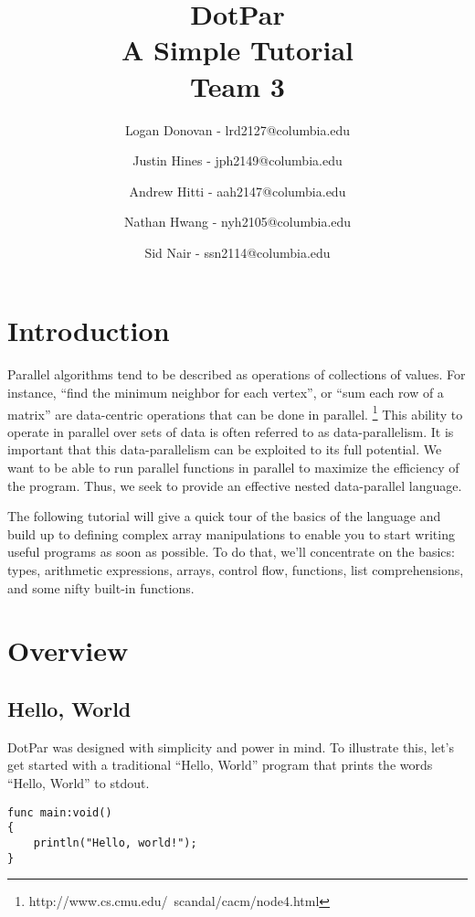 \documentclass{article}
\begin{document}
\title{DotPar \\ A Simple Tutorial \\ Team 3}
\author{
Logan Donovan - lrd2127@columbia.edu \and
Justin Hines - jph2149@columbia.edu \and
Andrew Hitti - aah2147@columbia.edu \and
Nathan Hwang - nyh2105@columbia.edu \and
Sid Nair - ssn2114@columbia.edu}
\maketitle

\section{Introduction}
Parallel algorithms tend to be described as operations of collections of values. For instance, ``find the minimum neighbor for each vertex'', or ``sum each row of a matrix'' are data-centric operations that can be done in parallel. \footnote{http://www.cs.cmu.edu/~scandal/cacm/node4.html} This ability to operate in parallel over sets of data is often referred to as data-parallelism. It is important that this data-parallelism can be exploited to its full potential. We want to be able to run parallel functions in parallel to maximize the efficiency of the program. Thus, we seek to provide an effective nested data-parallel language.

The following tutorial will give a quick tour of the basics of the language and build up to defining complex array manipulations to enable you to start writing useful programs as soon as possible. To do that, we'll concentrate on the basics: types, arithmetic expressions, arrays, control flow, functions, list comprehensions, and some nifty built-in functions.

\section{Overview}
\subsection{Hello, World}
DotPar was designed with simplicity and power in mind. To illustrate this, let's get started with a traditional ``Hello, World'' program that prints the words ``Hello, World'' to stdout.

\begin{verbatim}
func main:void()
{
    println("Hello, world!");
}
\end{verbatim}
\end{document}
